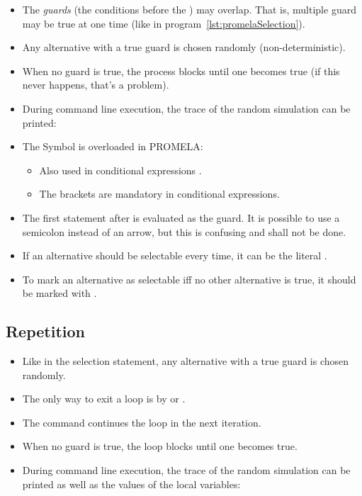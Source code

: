 			\begin{itemize}
				\item The \textit{guards} (the conditions before the \inlinePromela{->}) may overlap. That is, multiple guard may be true at one time (like in program~\ref{lst:promelaSelection}).
				\item Any alternative with a true guard is chosen randomly (non-deterministic).
				\item When no guard is true, the process blocks until one becomes true (if this never happens, that's a problem).
				\item During command line execution, the trace of the random simulation can be printed:
				\item The Symbol \inlinePromela{->} is overloaded in PROMELA:
				\begin{itemize}
					\item Also used in conditional expressions .
					\item The brackets are mandatory in conditional expressions.
				\end{itemize}
				\item The first statement after \inlinePromela{::} is evaluated as the guard. It is possible to use a semicolon instead of an arrow, but this is confusing and shall not be done.
				\item If an alternative should be selectable every time, it can be the literal .
				\item To mark an alternative as selectable iff no other alternative is true, it should be marked with .
			\end{itemize}

		\subsection{Repetition}
			
			
			\begin{itemize}
				\item Like in the selection statement, any alternative with a true guard is chosen randomly.
				\item The only way to exit a loop is by  or .
				\item The command  continues the loop in the next iteration.
				\item When no guard is true, the loop blocks until one becomes true.
				\item During command line execution, the trace of the random simulation can be printed as well as the values of the local variables:
			\end{itemize}
		
